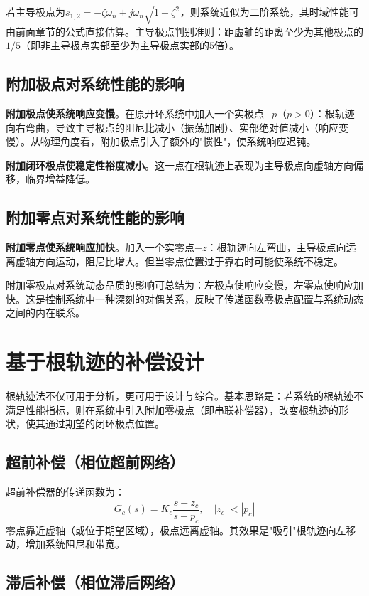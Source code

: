 若主导极点为$s_{1,2} = -\zeta\omega_n \pm j\omega_n\sqrt{1-\zeta^2}$，则系统近似为二阶系统，其时域性能可由前面章节的公式直接估算。主导极点判别准则：距虚轴的距离至少为其他极点的$1/5$（即非主导极点实部至少为主导极点实部的$5$倍）。

\subsection{附加极点对系统性能的影响}

\textbf{附加极点使系统响应变慢}。在原开环系统中加入一个实极点$-p$（$p>0$）：根轨迹向右弯曲，导致主导极点的阻尼比减小（振荡加剧）、实部绝对值减小（响应变慢）。从物理角度看，附加极点引入了额外的"惯性"，使系统响应迟钝。

\textbf{附加闭环极点使稳定性裕度减小}。这一点在根轨迹上表现为主导极点向虚轴方向偏移，临界增益降低。

\subsection{附加零点对系统性能的影响}

\textbf{附加零点使系统响应加快}。加入一个实零点$-z$：根轨迹向左弯曲，主导极点向远离虚轴方向运动，阻尼比增大。但当零点位置过于靠右时可能使系统不稳定。

\begin{remark}
附加零极点对系统动态品质的影响可总结为：{\heiti 左极点使响应变慢，左零点使响应加快}。这是控制系统中一种深刻的对偶关系，反映了传递函数零极点配置与系统动态之间的内在联系。
\end{remark}

\section{基于根轨迹的补偿设计}

根轨迹法不仅可用于分析，更可用于设计与综合。基本思路是：若系统的根轨迹不满足性能指标，则在系统中引入附加零极点（即串联补偿器），改变根轨迹的形状，使其通过期望的闭环极点位置。

\subsection{超前补偿（相位超前网络）}

超前补偿器的传递函数为：
\[
G_c(s) = K_c \frac{s + z_c}{s + p_c}, \quad |z_c| < |p_c|
\]
零点靠近虚轴（或位于期望区域），极点远离虚轴。其效果是"吸引"根轨迹向左移动，增加系统阻尼和带宽。

\subsection{滞后补偿（相位滞后网络）}

